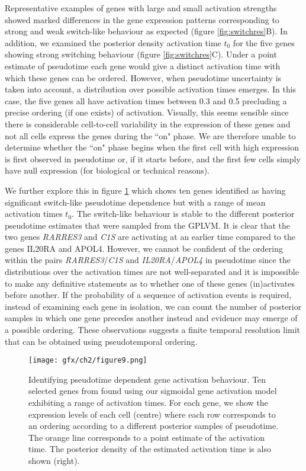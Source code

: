 Representative examples of genes with large and small activation strengths showed marked differences in the gene expression patterns corresponding  to strong and weak switch-like behaviour as expected (figure \ref{fig:switchres}B). In addition, we examined the posterior density activation time $t_0$ for the five genes showing strong switching behaviour (figure \ref{fig:switchres}C). Under a point estimate of pseudotime each gene would give a distinct activation time with which these genes can be ordered. However, when pseudotime uncertainty is taken into account, a distribution over possible activation times emerges. In this case, the five genes all have activation times between 0.3 and 0.5 precluding a precise ordering (if one exists) of activation. Visually, this seems sensible since there is considerable cell-to-cell variability in the expression of these genes and not all cells express the genes during the ``on" phase. We are therefore unable to determine whether the ``on" phase begins when the first cell with high expression is first observed in pseudotime or, if it starts before, and the first few cells simply have null expression (for biological or technical reasons).

We further explore this in figure \ref{fig:switchres2} which shows ten genes identified as having significant switch-like pseudotime dependence but with a range of mean activation times $t_0$. The switch-like behaviour is stable to the different posterior pseudotime estimates that were sampled from the GPLVM. It is clear that the two genes \emph{RARRES3} and \emph{C1S} are activating at an earlier time compared to the genes IL20RA and APOL4. However, we cannot be confident of the ordering within the pairs \emph{RARRES3}/\emph{C1S} and \emph{IL20RA}/\emph{APOL4} in pseudotime since the distributions over the activation times are not well-separated and it is impossible to make any definitive statements as to whether one of these genes (in)activates before another. If the probability of a sequence of activation events is required, instead of examining each gene in isolation, we can count the number of posterior samples in which one gene precedes another instead and evidence may emerge of a possible ordering. These observations suggests a finite temporal resolution limit that can be obtained using pseudotemporal ordering.

\begin{figure}%
\centering
	\texttt{[image: gfx/ch2/figure9.png]}
\caption{ Identifying pseudotime dependent gene activation behaviour. Ten selected genes from \cite{Trapnell2014-xi} found using our  sigmoidal gene activation model exhibiting a range of activation times. For each gene, we show the expression levels of each cell (centre) where each row corresponds to an ordering according to a different posterior samples of pseudotime. The orange line corresponds to a point estimate of the activation time. The posterior density of the estimated activation time is also shown (right).
} \label{fig:switchres2}
\end{figure}

